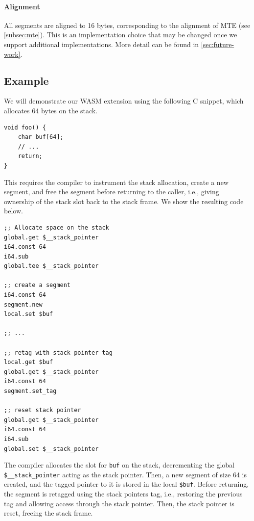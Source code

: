 \paragraph{Alignment}
All segments are aligned to 16 bytes, corresponding to the alignment of MTE (see \cref{subsec:mte}).
This is an implementation choice that may be changed once we support additional implementations.
More detail can be found in \cref{sec:future-work}.

\subsection{Example}
\label{subsec:example}

We will demonstrate our \ac{WASM} extension using the following C snippet, which allocates 64 bytes on the stack.
\begin{lstlisting}[frame=h,style=customc,
    label={lst:wasm-example-c}]
void foo() {
    char buf[64];
    // ...
    return;
}
\end{lstlisting}

This requires the compiler to instrument the stack allocation, create a new segment, and free the segment before returning to the caller, i.e., giving ownership of the stack slot back to the stack frame.
We show the resulting code below.

\begin{lstlisting}[frame=h,style=customwasm,
    label={lst:wasm-example}]
;; Allocate space on the stack
global.get $__stack_pointer
i64.const 64
i64.sub
global.tee $__stack_pointer

;; create a segment
i64.const 64
segment.new
local.set $buf

;; ...

;; retag with stack pointer tag
local.get $buf
global.get $__stack_pointer
i64.const 64
segment.set_tag

;; reset stack pointer
global.get $__stack_pointer
i64.const 64
i64.sub
global.set $__stack_pointer
\end{lstlisting}

The compiler allocates the slot for \texttt{buf} on the stack, decrementing the global \texttt{\$\_\_stack\_pointer} acting as the stack pointer.
Then, a new segment of size 64 is created, and the tagged pointer to it is stored in the local \lstinline[style=customwasm]{$buf}.
Before returning, the segment is retagged using the stack pointers tag, i.e., restoring the previous tag and allowing access through the stack pointer.
Then, the stack pointer is reset, freeing the stack frame.


